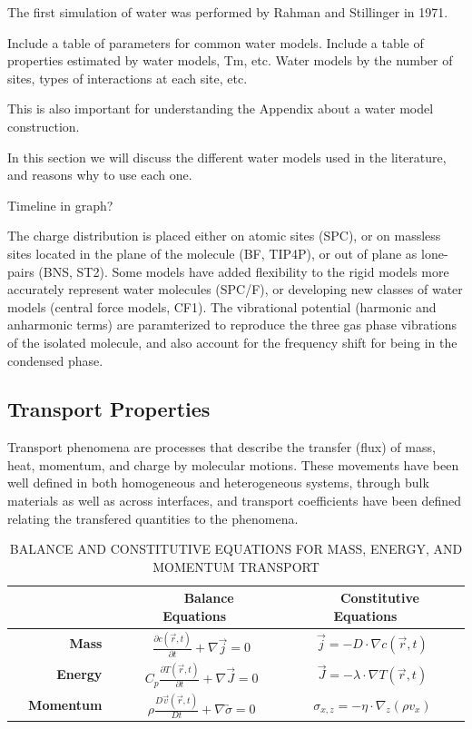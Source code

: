 The first simulation of water was performed by Rahman and Stillinger
in 1971\cite{Rahman1971}.

Include a table of parameters for common water models.
Include a table of properties estimated by water models, Tm, etc.
Water models by the number of sites, types of interactions at each
site, etc. 


This is also important for understanding the Appendix about a water
model construction.

In this section we will discuss the different water models used in the
literature, and reasons why to use each one. 


Timeline in graph?

The charge distribution is placed either on atomic sites (SPC), or on
massless sites located in the plane of the molecule (BF, TIP4P), or
out of plane as lone-pairs (BNS, ST2). Some models have added
flexibility to the rigid models more accurately represent water
molecules (SPC/F), or developing new classes of water models (central
force models, CF1). The vibrational potential (harmonic and anharmonic
terms) are paramterized to reproduce the three gas phase vibrations of
the isolated molecule, and also account for the frequency shift for
being in the condensed phase. 


 


\subsection{Transport Properties}
Transport phenomena are processes that describe the transfer (flux) of
mass, heat, momentum, and charge by molecular motions. These movements
have been well defined in both homogeneous and heterogeneous systems,
through bulk materials as well as across interfaces, and transport
coefficients have been defined relating the transfered quantities to
the phenomena.


\begin{longtable}{rcc}
	\caption{BALANCE AND CONSTITUTIVE EQUATIONS FOR MASS, ENERGY, AND MOMENTUM TRANSPORT}
	\label{tab:transport}
	\\\hline \hline
 	& \textbf{~~Balance Equations~~} & \textbf{~~Constitutive Equations~~}\\ \hline 
	\textbf{~~Mass~~} & $\frac{\partial c (\vec{r}, t)}{\partial t} + \nabla \vec{j} = 0$ & $\vec{j} = -D \cdot \nabla c(\vec{r}, t)$\\
	\textbf{~~Energy~~} & $C_p \frac{\partial T (\vec{r}, t)}{\partial t} + \nabla \vec{J} = 0$ & $\vec{J} = -\lambda \cdot \nabla T(\vec{r}, t)$\\
	\textbf{~~Momentum~~} & $\rho \frac{D \vec{v}(\vec{r}, t)}{Dt} + \nabla \overleftrightarrow{\sigma} = 0$ & $\sigma_{x,z} = -\eta \cdot \nabla_z (\rho v_x)$\\ \hline \hline
\end{longtable}






